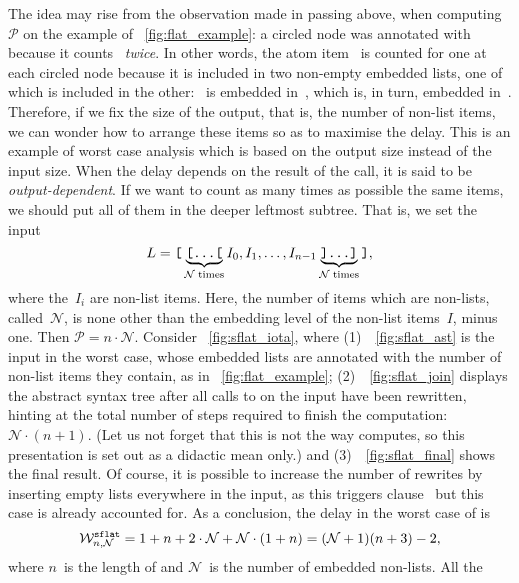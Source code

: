 The idea may rise from the observation made in passing above, when
computing~\(\mathcal{P}\) on the example of
\fig~\vref{fig:flat_example}: a circled node was annotated with
\clause{\zeta} because it counts~ \emph{twice}. In other
words, the atom item~ is counted for one at each circled
node because it is included in two non\hyp{}empty embedded lists, one
of which is included in the other: ~is embedded
in~\erlcode{[a]}, which is, in turn, embedded
in~\erlcode{[[a],b]}. Therefore, if we fix the size of the output,
that is, the number of non\hyp{}list items, we can wonder how to
arrange these items so as to maximise the delay. This is an example of
worst case analysis which is based on the output size instead of the
input size.  When the delay depends on the result of the call, it is
said to be \emph{output\hyp{}dependent}. If we want to count as many
times as possible the same items, we should put all of them in the
deeper leftmost subtree. That is, we set the input
\[
L = \erlcode{[}\underbrace{\erlcode{[...[}}_{\mathcal{N} \;
        \text{times}}I_0, I_1, \dots, I_{n-1}
      \underbrace{\erlcode{]...]}}_{\mathcal{N} \;
    \text{times}}\erlcode{]},
\]
where the~\(I_i\) are non\hyp{}list items. Here, the number of items
which are non\hyp{}lists, called~\(\mathcal{N}\), is none other than
the embedding level of the non\hyp{}list items~\(I\), minus one. Then
\(\mathcal{P} = n \cdot \mathcal{N}\). Consider
\fig~\vref{fig:sflat_iota}, where (1)~\Fig~\vref{fig:sflat_ast} is the
input in the worst case, whose embedded lists are annotated with the
number of non\hyp{}list items they contain, as in
\fig~\vref{fig:flat_example}; (2)~\Fig~\vref{fig:sflat_join} displays
the abstract syntax tree after all calls to  on the
input have been rewritten, hinting at the total number of steps
required to finish the computation: \(\mathcal{N} \cdot (n+1)\). (Let
us not forget that this is not the way \Erlang computes, so this
presentation is set out as a didactic mean only.) and
(3)~\Fig~\vref{fig:sflat_final} shows the final result. Of course, it
is possible to increase the number of rewrites by inserting empty
lists everywhere in the input, as this triggers clause~\clause{\beta}
but this case is already accounted for. As a conclusion, the delay in
the worst case of  is
\[
\worst{sflat}{n,\mathcal{N}} = 1 + n + 2 \cdot \mathcal{N} +
\mathcal{N} \cdot (1+n) = (\mathcal{N} + 1)(n + 3) - 2,
\]
where \(n\)~is the length of  and
\(\mathcal{N}\)~is the number of embedded non\hyp{}lists. All the

